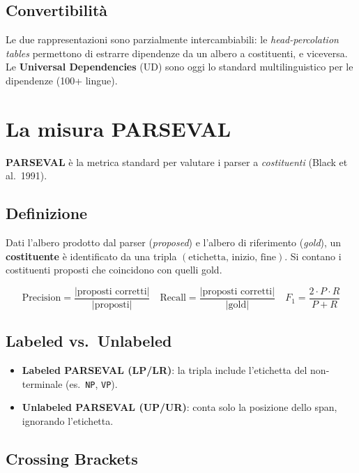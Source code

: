 \documentclass[12pt,a4paper]{article}
\begin{document}
\subsection{Convertibilità}

Le due rappresentazioni sono parzialmente intercambiabili: le \emph{head-percolation tables} permettono di estrarre dipendenze da un albero a costituenti, e viceversa. Le \textbf{Universal Dependencies} (UD) sono oggi lo standard multilinguistico per le dipendenze (100+ lingue).

\section{La misura PARSEVAL}

\textbf{PARSEVAL} è la metrica standard per valutare i parser a \emph{costituenti} (Black et al.\ 1991).

\subsection{Definizione}

Dati l'albero prodotto dal parser (\emph{proposed}) e l'albero di riferimento (\emph{gold}), un \textbf{costituente} è identificato da una tripla $(\text{etichetta},\, \text{inizio},\, \text{fine})$. Si contano i costituenti proposti che coincidono con quelli gold.

\begin{defbox}
\[
\text{Precision} = \frac{|\text{proposti corretti}|}{|\text{proposti}|}
\quad
\text{Recall} = \frac{|\text{proposti corretti}|}{|\text{gold}|}
\quad
F_1 = \frac{2 \cdot P \cdot R}{P + R}
\]
\end{defbox}

\subsection{Labeled vs.\ Unlabeled}

\begin{itemize}[leftmargin=1.5em]
  \item \textbf{Labeled PARSEVAL (LP/LR)}: la tripla include l'etichetta del non-terminale (es.\ \texttt{NP}, \texttt{VP}).
  \item \textbf{Unlabeled PARSEVAL (UP/UR)}: conta solo la posizione dello span, ignorando l'etichetta.
\end{itemize}

\subsection{Crossing Brackets}
\end{document}
